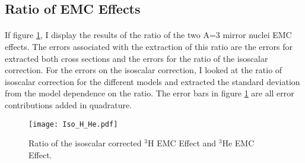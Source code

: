 \subsection{Ratio of EMC Effects}
\paragraph{} If figure \ref{ISORatio}, I display the results of the ratio of the two A=3 mirror nuclei EMC effects. The errors associated with the extraction of this ratio are the errors for extracted both cross sections and the errors for the ratio of the isoscalar correction. For the errors on the isoscalar correction, I looked at the ratio of isoscalar correction for the different models and extracted the standard deviation from the model dependence on the ratio. The error bars in figure \ref{ISORatio} are all error contributions added in quadrature. 

\begin{figure}
	\texttt{[image: Iso\_H\_He.pdf]}
	\caption{Ratio of the isoscalar corrected  $^3$H EMC Effect and $^3$He EMC Effect.}\label{ISORatio}
\end{figure}
